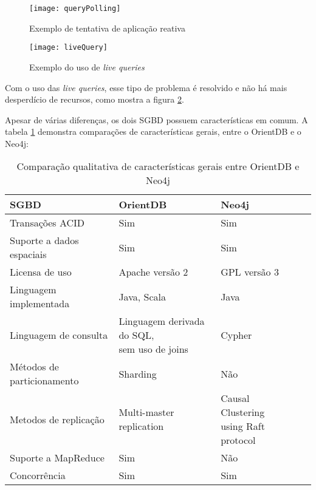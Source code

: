 \begin{figure}[H]
	\centering
    \texttt{[image: queryPolling]}
    \caption{Exemplo de tentativa de aplicação reativa}
    \label{fig:orientdbReativo}
\end{figure}

\begin{figure}[H]
	\centering
    \texttt{[image: liveQuery]}
    \caption{Exemplo do uso de \textit{live queries}}
    \label{fig:orientDBLiveQuery}
\end{figure}

	Com o uso das \textit{live queries}, esse tipo de problema é resolvido e não há mais desperdício de recursos, como mostra a figura \ref{fig:orientDBLiveQuery}.

	Apesar de várias diferenças, os dois SGBD possuem características em comum. A tabela \ref{table:2} demonstra comparações de características gerais, entre o OrientDB e o Neo4j:
	
\begin{table}[h!]
\centering
\begin{tabular}{|l|l|l|l|l|}
\hline
SGBD                       & OrientDB                                    & Neo4j \\ \hline
Transações ACID            & Sim                                         & Sim \\ \hline
Suporte a dados espaciais  & Sim                                         & Sim \\ \hline
Licensa de uso             & Apache versão 2                             & GPL versão 3 \\ \hline
Linguagem implementada     & Java, Scala                                 & Java \\ \hline
Linguagem de consulta      & \makecell{Linguagem derivada do SQL,\\ sem uso de joins} & Cypher \\ \hline
Métodos de particionamento & Sharding                                    & Não \\ \hline
Metodos de replicação      & Multi-master replication                    & \makecell{Causal Clustering \\ using Raft protocol} \\ \hline
Suporte a MapReduce        & Sim                                         & Não \\ \hline
Concorrência               & Sim                                         & Sim \\ \hline
\end{tabular}
\caption{Comparação qualitativa de características gerais entre OrientDB e Neo4j}
\label{table:2}
\end{table}

